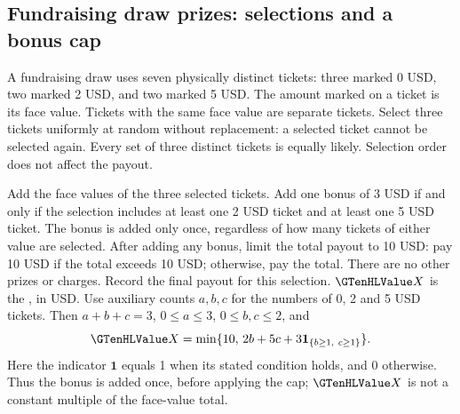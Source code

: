 \clearpage
\subsection{Fundraising draw prizes: selections and a bonus cap}\label{prob:prize}
A fundraising draw uses seven physically distinct tickets: three marked 0 USD, two marked 2 USD, and two marked 5 USD. The amount marked on a ticket is its face value. Tickets with the same face value are separate tickets. Select three tickets uniformly at random without replacement: a selected ticket cannot be selected again. Every set of three distinct tickets is equally likely. Selection order does not affect the payout.

Add the face values of the three selected tickets. Add one bonus of 3 USD if and only if the selection includes at least one 2 USD ticket and at least one 5 USD ticket. The bonus is added only once, regardless of how many tickets of either value are selected. After adding any bonus, limit the total payout to 10 USD: pay 10 USD if the total exceeds 10 USD; otherwise, pay the total. There are no other prizes or charges. Record the final payout for this selection.
$\cTwoValue{X}$ is the , in USD. Use auxiliary counts $a,b,c$ for the numbers of 0, 2 and 5 USD tickets. Then $a+b+c=3$, $0\leq a\leq3$, $0\leq b,c\leq2$, and
\[
\cTwoValue{X}=\min\{10,\,2b+5c+3\mathbf{1}_{\{b\geq1,\ c\geq1\}}\}.
\]
Here the indicator $\mathbf{1}$ equals 1 when its stated condition holds, and 0 otherwise. Thus the bonus is added once, before applying the cap; $\cTwoValue{X}$ is not a constant multiple of the face-value total.

